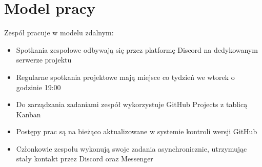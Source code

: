 \documentclass[12pt,a4paper]{book}
\begin{document}
\section{Model pracy}
Zespół pracuje w modelu zdalnym:
\begin{itemize}
    \item Spotkania zespołowe odbywają się przez platformę Discord na dedykowanym serwerze projektu
    \item Regularne spotkania projektowe mają miejsce co tydzień we wtorek o godzinie 19:00
    \item Do zarządzania zadaniami zespół wykorzystuje GitHub Projects z tablicą Kanban
    \item Postępy prac są na bieżąco aktualizowane w systemie kontroli wersji GitHub
    \item Członkowie zespołu wykonują swoje zadania asynchronicznie, utrzymując stały kontakt przez Discord oraz Messenger
\end{itemize}
\end{document}
